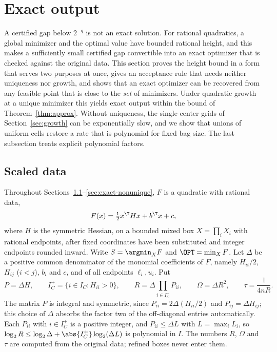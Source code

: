 \section{Exact output}\label{sec:exact}

A certified gap below $2^{-q}$ is not an exact solution. For rational
quadratics, a global minimizer and the optimal value have bounded rational
height, and this makes a sufficiently small certified gap convertible into an
exact optimizer that is checked against the original data. This section
proves the height bound in a form that serves two purposes at once, gives an
acceptance rule that needs neither uniqueness nor growth, and shows that an
exact optimizer can be recovered from any feasible point that is close to the
\emph{set} of minimizers. Under quadratic growth at a unique minimizer this
yields exact output within the bound of Theorem~\ref{thm:approx}. Without
uniqueness, the single-center grids of Section~\ref{sec:growth} can be
exponentially slow, and we show that unions of uniform cells restore a rate
that is polynomial for fixed bag size. The last subsection treats explicit
polynomial factors.

\subsection{Scaled data}\label{sec:exact-data}

Throughout Sections~\ref{sec:exact-data}--\ref{sec:exact-nonunique}, $F$ is a
quadratic with rational data,
\[
F(x)=\tfrac12x^{\T}Hx+b^{\T}x+c ,
\]
where $H$ is the symmetric Hessian, on a bounded mixed box
$X=\prod_iX_i$ with rational endpoints, after fixed coordinates have been
substituted and integer endpoints rounded inward. Write
$S=\argmin_XF$ and $\OPT=\min_XF$. Let $\Delta$ be a positive common denominator
of the monomial coefficients of $F$, namely $H_{ii}/2$, $H_{ij}$ ($i<j$),
$b_i$ and $c$, and of all endpoints $\ell_i,u_i$. Put
\begin{equation}\label{eq:exact-constants}
P=\Delta H,\qquad I_C^+=\{i\in I_C:H_{ii}>0\},\qquad
R=\Delta\prod_{i\in I_C^+}P_{ii},\qquad \Omega=\Delta R^2,\qquad \tau=\frac1{4nR}.
\end{equation}
The matrix $P$ is integral and symmetric, since $P_{ii}=2\Delta(H_{ii}/2)$ and
$P_{ij}=\Delta H_{ij}$; this choice of $\Delta$ absorbs the factor two of the
off-diagonal entries automatically. Each $P_{ii}$ with $i\in I_C^+$ is a
positive integer, and $P_{ii}\le\Delta L$ with $L=\max_iL_i$, so
$\log_2R\le\log_2\Delta+\abs{I_C^+}\log_2(\Delta L)$ is polynomial in $I$. The numbers
$R$, $\Omega$ and $\tau$ are computed from the original data; refined boxes never
enter them.

